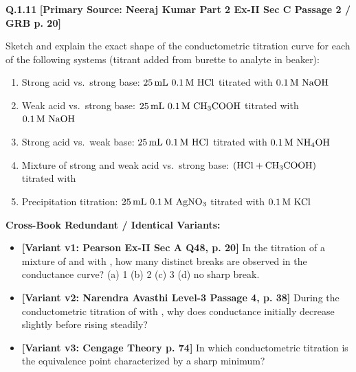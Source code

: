\begin{problembox}
\textbf{Q.1.11} \hfill \textbf{[Primary Source: Neeraj Kumar Part 2 Ex-II Sec C Passage 2 / GRB p. 20]}
\label{q:qb-c1-11}

Sketch and explain the exact shape of the conductometric titration curve for each of the following systems (titrant added from burette to analyte in beaker):
\begin{enumerate}[label=(\alph*)]
    \item Strong acid vs.\ strong base: $25\,\text{mL } 0.1\,\text{M } \ce{HCl}$ titrated with $0.1\,\text{M } \ce{NaOH}$
    \item Weak acid vs.\ strong base: $25\,\text{mL } 0.1\,\text{M } \ce{CH3COOH}$ titrated with $0.1\,\text{M } \ce{NaOH}$
    \item Strong acid vs.\ weak base: $25\,\text{mL } 0.1\,\text{M } \ce{HCl}$ titrated with $0.1\,\text{M } \ce{NH4OH}$
    \item Mixture of strong and weak acid vs.\ strong base: $(\ce{HCl} + \ce{CH3COOH})$ titrated with 
    \item Precipitation titration: $25\,\text{mL } 0.1\,\text{M } \ce{AgNO3}$ titrated with $0.1\,\text{M } \ce{KCl}$
\end{enumerate}

\tcbline
\textbf{\color{accentamber}Cross-Book Redundant / Identical Variants:}
\begin{itemize}[leftmargin=*,itemsep=2pt]
    \item \textbf{[Variant v1: Pearson Ex-II Sec A Q48, p. 20]} In the titration of a mixture of  and  with , how many distinct breaks are observed in the conductance curve? (a) 1 (b) 2 (c) 3 (d) no sharp break.
    \item \textbf{[Variant v2: Narendra Avasthi Level-3 Passage 4, p. 38]} During the conductometric titration of  with , why does conductance initially decrease slightly before rising steadily?
    \item \textbf{[Variant v3: Cengage Theory p. 74]} In which conductometric titration is the equivalence point characterized by a sharp minimum?
\end{itemize}
\end{problembox}
